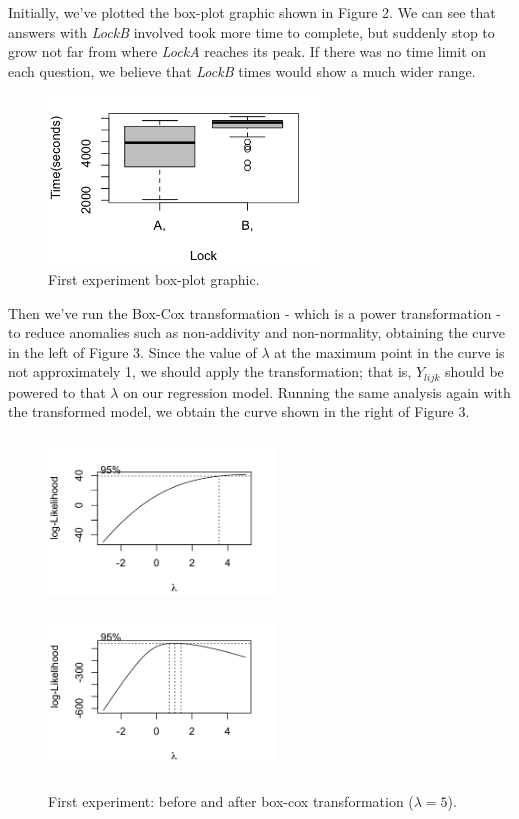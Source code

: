 Initially, we've plotted the box-plot graphic shown in Figure 2. We can see that answers with \emph{LockB} involved took more time to complete, but suddenly stop to grow not far from where \emph{LockA} reaches its peak. If there was no time limit on each question, we believe that \emph{LockB} times would show a much wider range.

\begin{figure}
\centering
\includegraphics[height=4.5cm]{img/u1.png}
\caption{First experiment box-plot graphic.}
\end{figure}

Then we've run the Box-Cox transformation - which is a power transformation - to reduce anomalies such as non-addivity and non-normality, obtaining the curve in the left of Figure 3. Since the value of $\lambda$ at the maximum point in the curve is not approximately 1, we should apply the transformation; that is, $Y_{lijk}$ should be powered to that $\lambda$ on our regression model. Running the same analysis again with the transformed model, we obtain the curve shown in the right of Figure 3.

\begin{figure}
\includegraphics[height=4.5cm, width=6cm]{img/u2.png}
\hfill
\includegraphics[height=4.3cm, width=6cm]{img/u2boxcox.png}
\caption{First experiment: before and after box-cox transformation ($\lambda = 5$).}
\end{figure}
\\

